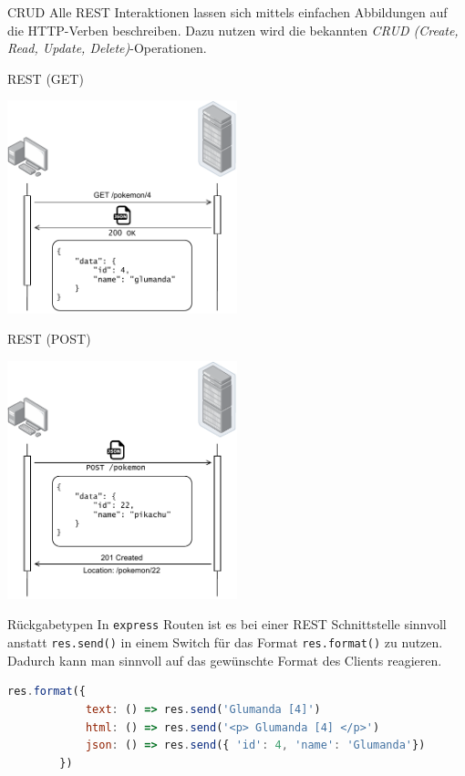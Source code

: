 \begin{defi}{CRUD}
    Alle REST Interaktionen lassen sich mittels einfachen Abbildungen auf die HTTP-Verben beschreiben.
    Dazu nutzen wird die bekannten \emph{CRUD (Create, Read, Update, Delete)}-Operationen.
\end{defi}

\begin{example}{REST (GET)}
    \begin{center}
        \includegraphics[width=0.5\textwidth]{includes/figures/example_rest_get.pdf}
    \end{center}
\end{example}

\begin{example}{REST (POST)}
    \begin{center}
        \includegraphics[width=0.5\textwidth]{includes/figures/example_rest_post.pdf}
    \end{center}
\end{example}

\begin{bonus}{Rückgabetypen}
    In \texttt{express} Routen ist es bei einer REST Schnittstelle sinnvoll anstatt \texttt{res.send()} in einem Switch für das Format \texttt{res.format()} zu nutzen.
    Dadurch kann man sinnvoll auf das gewünschte Format des Clients reagieren.

    \begin{lstlisting}[language=JavaScript]
        res.format({
            text: () => res.send('Glumanda [4]')
            html: () => res.send('<p> Glumanda [4] </p>')
            json: () => res.send({ 'id': 4, 'name': 'Glumanda'})
        })
    \end{lstlisting}
\end{bonus}

